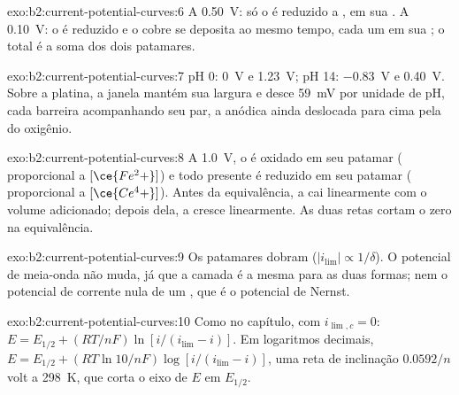 \begin{solution}{exo:b2:current-potential-curves:6}
A \qty{0.50}{V}: só o  é reduzido a , em sua .
A \qty{0.10}{V}: o  é reduzido e o cobre se deposita ao mesmo tempo,
cada um em sua ; o total é a soma dos dois patamares.
\end{solution}

\begin{solution}{exo:b2:current-potential-curves:7}
pH 0: \qty{0}{V} e \qty{1.23}{V}; pH 14: \qty{-0.83}{V} e \qty{0.40}{V}. Sobre a
platina, a janela mantém sua largura e desce \qty{59}{mV} por unidade de pH,
cada barreira acompanhando seu par, a anódica ainda deslocada para cima pela
 do oxigênio.
\end{solution}

\begin{solution}{exo:b2:current-potential-curves:8}
A \qty{1.0}{V}, o  é oxidado em seu patamar (
proporcional a $[\ce{Fe^2+}]$) e todo  presente é reduzido em seu
patamar ( proporcional a $[\ce{Ce^4+}]$). Antes da
equivalência, a  cai linearmente com o volume adicionado;
depois dela, a  cresce linearmente. As duas retas cortam o
zero na equivalência.
\end{solution}

\begin{solution}{exo:b2:current-potential-curves:9}
Os patamares dobram ($|i_{\lim}| \propto 1/\delta$). O potencial de meia-onda não
muda, já que a camada é a mesma para as duas formas; nem o potencial de
corrente nula de um , que é o potencial de Nernst.
\end{solution}

\begin{solution}{exo:b2:current-potential-curves:10}
Como no capítulo, com $i_{\lim,c} = 0$: $E = E_{1/2} + (RT/nF)\ln[i/(i_{\lim} -
i)]$. Em logaritmos decimais, $E = E_{1/2} + (RT\ln 10/nF)\log[i/(i_{\lim} - i)]$,
uma reta de inclinação $0.0592/n$ volt a \qty{298}{K}, que corta o eixo de
$E$ em $E_{1/2}$.
\end{solution}

